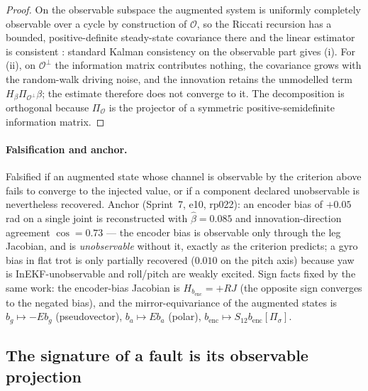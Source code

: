 \begin{proof}
On the observable subspace the augmented system is uniformly completely
observable over a cycle by construction of $\mathcal{O}$, so the Riccati
recursion has a bounded, positive-definite steady-state covariance there and
the linear estimator is consistent \cite{barrau2017invariant}: standard
Kalman consistency on the observable part gives (i). For (ii), on
$\mathcal{O}^\perp$ the information matrix contributes nothing, the covariance
grows with the random-walk driving noise, and the innovation retains the
unmodelled term $H_\beta \Pi_{\mathcal{O}^\perp}\beta$; the estimate therefore
does not converge to it. The decomposition is orthogonal because
$\Pi_{\mathcal{O}}$ is the projector of a symmetric positive-semidefinite
information matrix.
\end{proof}

\paragraph{Falsification and anchor.}
Falsified if an augmented state whose channel is observable by the criterion
above fails to converge to the injected value, or if a component declared
unobservable is nevertheless recovered. Anchor (Sprint~7, e10, rp022): an
encoder bias of $+0.05$\,rad on a single joint is reconstructed with
$\hat\beta = 0.085$ and innovation-direction agreement $\cos = 0.73$ --- the
encoder bias is observable only through the leg Jacobian, and is
\emph{unobservable} without it, exactly as the criterion predicts; a gyro bias
in flat trot is only partially recovered ($0.010$ on the pitch axis) because
yaw is InEKF-unobservable and roll/pitch are weakly excited. Sign facts fixed
by the same work: the encoder-bias Jacobian is $H_{b_{\mathrm{enc}}} = +RJ$
(the opposite sign converges to the negated bias), and the mirror-equivariance
of the augmented states is $b_g \mapsto -E b_g$ (pseudovector),
$b_a \mapsto E b_a$ (polar), $b_{\mathrm{enc}} \mapsto S_{12} b_{\mathrm{enc}}[\Pi_\sigma]$.

\subsection{The signature of a fault is its observable projection}
\label{sec:n2-signature}

